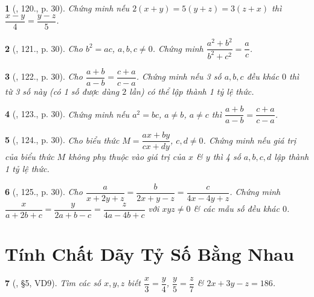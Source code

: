 \documentclass{article}
\newtheorem{baitoan}{}
\begin{document}
\begin{baitoan}[\cite{Tuyen_Toan_7}, 120., p. 30]
	Chứng minh nếu $2(x + y) = 5(y + z) = 3(z + x)$ thì $\dfrac{x - y}{4} = \dfrac{y - z}{5}$.
\end{baitoan}

\begin{baitoan}[\cite{Tuyen_Toan_7}, 121., p. 30]
	Cho $b^2 = ac$, $a,b,c\ne 0$. Chứng minh $\dfrac{a^2 + b^2}{b^2 + c^2} = \dfrac{a}{c}$.
\end{baitoan}

\begin{baitoan}[\cite{Tuyen_Toan_7}, 122., p. 30]
	Cho $\dfrac{a + b}{a - b} = \dfrac{c + a}{c - a}$. Chứng minh nếu 3 số $a,b,c$ đều khác $0$ thì từ 3 số này (có 1 số được dùng $2$ lần) có thể lập thành 1 tỷ lệ thức.
\end{baitoan}

\begin{baitoan}[\cite{Tuyen_Toan_7}, 123., p. 30]
	Chứng minh nếu $a^2 = bc$, $a\ne b$, $a\ne c$ thì $\dfrac{a + b}{a - b} = \dfrac{c + a}{c - a}$.
\end{baitoan}

\begin{baitoan}[\cite{Tuyen_Toan_7}, 124., p. 30]
	Cho biểu thức $M = \dfrac{ax + by}{cx + dy}$, $c,d\ne 0$. Chứng minh nếu giá trị của biểu thức $M$ không phụ thuộc vào giá trị của $x$ \& $y$ thì 4 số $a,b,c,d$ lập thành 1 tỷ lệ thức.
\end{baitoan}

\begin{baitoan}[\cite{Tuyen_Toan_7}, 125., p. 30]
	Cho $\dfrac{a}{x + 2y + z} = \dfrac{b}{2x + y - z} = \dfrac{c}{4x - 4y + z}$. Chứng minh $\dfrac{x}{a + 2b + c} = \dfrac{y}{2a + b - c} = \dfrac{z}{4a - 4b + c}$ với $xyz\ne 0$ \& các mẫu số đều khác $0$.
\end{baitoan}


\section{Tính Chất Dãy Tỷ Số Bằng Nhau}

\begin{baitoan}[\cite{Binh_Toan_7_tap_1}, \S5, VD9]
	Tìm các số $x,y,z$ biết $\dfrac{x}{3} = \dfrac{y}{4}$, $\dfrac{y}{5} = \dfrac{z}{7}$ \& $2x + 3y - z = 186$.
\end{baitoan}
\end{document}
